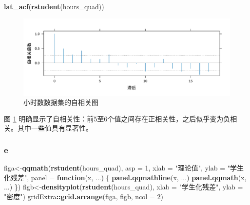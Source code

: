 \documentclass[
]{article}
\newenvironment{Shaded}{\begin{snugshade}}{\end{snugshade}}
\newcommand{\AttributeTok}[1]{\textcolor[rgb]{0.13,0.29,0.53}{#1}}
\newcommand{\ControlFlowTok}[1]{\textcolor[rgb]{0.13,0.29,0.53}{\textbf{#1}}}
\newcommand{\DecValTok}[1]{\textcolor[rgb]{0.00,0.00,0.81}{#1}}
\newcommand{\FunctionTok}[1]{\textcolor[rgb]{0.13,0.29,0.53}{\textbf{#1}}}
\newcommand{\NormalTok}[1]{#1}
\newcommand{\OtherTok}[1]{\textcolor[rgb]{0.56,0.35,0.01}{#1}}
\newcommand{\SpecialCharTok}[1]{\textcolor[rgb]{0.81,0.36,0.00}{\textbf{#1}}}
\newcommand{\StringTok}[1]{\textcolor[rgb]{0.31,0.60,0.02}{#1}}
\begin{document}
\begin{Shaded}
\begin{Highlighting}[]
\FunctionTok{lat\_acf}\NormalTok{(}\FunctionTok{rstudent}\NormalTok{(hours\_quad))}
\end{Highlighting}
\end{Shaded}

\begin{figure}
\centering
\includegraphics{chapter3_files/figure-latex/hours-acf-1.pdf}
\caption{\label{fig:hours-acf}小时数数据集的自相关图}
\end{figure}

图 \ref{fig:hours-acf} 明确显示了自相关性：前5至6个值之间存在正相关性，之后似乎变为负相关。其中一些值具有显著性。

\hypertarget{e-3}{%
\subsubsection*{e}\label{e-3}}

\begin{Shaded}
\begin{Highlighting}[]
\NormalTok{figa}\OtherTok{\textless{}{-}}\FunctionTok{qqmath}\NormalTok{(}\FunctionTok{rstudent}\NormalTok{(hours\_quad), }\AttributeTok{asp =} \DecValTok{1}\NormalTok{,}
        \AttributeTok{xlab =} \StringTok{"理论值"}\NormalTok{, }\AttributeTok{ylab =} \StringTok{"学生化残差"}\NormalTok{,}
        \AttributeTok{panel =} \ControlFlowTok{function}\NormalTok{(x, ...) \{}
          \FunctionTok{panel.qqmathline}\NormalTok{(x, ...)}
          \FunctionTok{panel.qqmath}\NormalTok{(x, ...)}
\NormalTok{        \})}
\NormalTok{figb}\OtherTok{\textless{}{-}}\FunctionTok{densityplot}\NormalTok{(}\FunctionTok{rstudent}\NormalTok{(hours\_quad), }\AttributeTok{xlab =} \StringTok{"学生化残差"}\NormalTok{, }
             \AttributeTok{ylab =} \StringTok{"密度"}\NormalTok{)}
\NormalTok{gridExtra}\SpecialCharTok{::}\FunctionTok{grid.arrange}\NormalTok{(figa, figb, }\AttributeTok{ncol =} \DecValTok{2}\NormalTok{)}
\end{Highlighting}
\end{Shaded}
\end{document}
